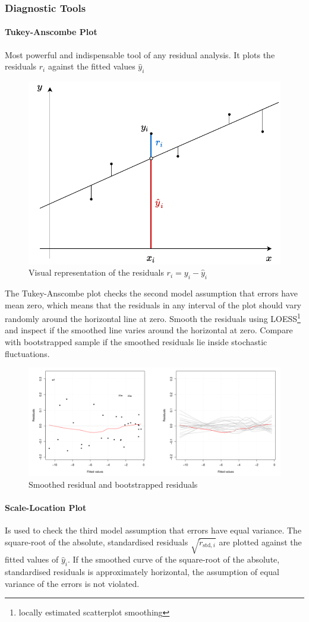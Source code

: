 \documentclass[11pt]{article}
\theoremstyle{definition}
\begin{document}
\subsubsection{Diagnostic Tools}
\label{sssec:DiagnosticPlots}
\paragraph{Tukey-Anscombe Plot}
Most powerful and indispensable tool of any residual analysis. It plots the residuals $r_i$ against the fitted values $\hat{y}_i$
\begin{figure}[H]
	\centering
	\includegraphics[width=0.5\linewidth]{img/TukeyAnscombe.pdf}
	\caption{Visual representation of the residuals $r_i = y_i - \hat{y}_i$}
\end{figure}
The Tukey-Anscombe plot checks the second model assumption that errors have mean zero, which means that the residuals in any interval of the plot should vary randomly around the horizontal line at zero.
Smooth the residuals using LOESS\footnote{locally estimated scatterplot smoothing} and inspect if the smoothed line varies around the horizontal at zero. Compare with bootstrapped sample if the smoothed residuals lie inside stochastic fluctuations.

\begin{figure}[H]
	\centering
	\includegraphics[width=0.8\linewidth]{img/tukey_anscombe_plot}
	\caption{Smoothed residual and bootstrapped residuals}
	\label{fig:tukeyanscombeplot}
\end{figure}


\paragraph{Scale-Location Plot}
Is used to check the third model assumption that errors have equal variance. The square-root of the absolute, standardised residuals $\sqrt{\tilde{r}_{\text{std},i}}$ are plotted against the fitted values of $\hat{y}_i$. If the smoothed curve of the square-root of the absolute, standardised residuals is approximately horizontal, the assumption of equal variance of the errors is not violated.
\end{document}
